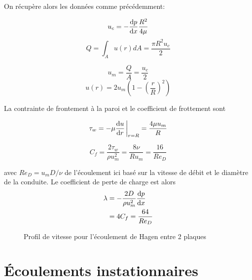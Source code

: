 \documentclass[a4paper,11pt]{report}
\begin{document}
        On récupère alors les données comme précédemment:
        \begin{multicols}{2}
          \begin{equation*}
            u_c = -\dv{p}{x} \frac{R^2}{4\mu}
          \end{equation*}
          \begin{equation*}
            Q = \int_A u(r)dA = \frac{\pi R^2 u_c}{2}
          \end{equation*}

          \begin{equation*}
            u_m = \frac{Q}{A} = \frac{u_c}{2}
          \end{equation*}
          \begin{equation}
            u(r) = 2 u_m \left(1 - \left(\frac{r}{R}\right)^2\right)
          \end{equation}
        \end{multicols}
        La contrainte de frontement à la paroi et le coefficient de frottement sont
        \begin{multicols}{2}
          \begin{equation*}
            \tau_w = -\mu \dv{u}{r}\eval_{r=R} = \frac{4\mu u_m}{R}
          \end{equation*}

          \begin{equation*}
              C_f = \frac{2 \tau_w}{\rho u_m^2} = \frac{8\nu}{R u_m} = \frac{16}{Re_D}
          \end{equation*}
        \end{multicols}
        avec $Re_D = u_m D/\nu$ de l'écoulement ici basé sur la vitesse de débit et le diamètre de la conduite. Le coefficient de perte de charge est alors
        \begin{equation}
          \begin{aligned}
            \lambda &= - \frac{2D}{\rho u_m^2} \dv{p}{x}\\
            &= 4 C_f = \frac{64}{Re_D}
          \end{aligned}
        \end{equation}

        \begin{figure}[!h]
          \centering
          
          \label{fig:HagenProfile}
          \caption{Profil de vitesse pour l'écoulement de Hagen entre 2 plaques}
        \end{figure}

  \section{Écoulements instationnaires}
\end{document}
